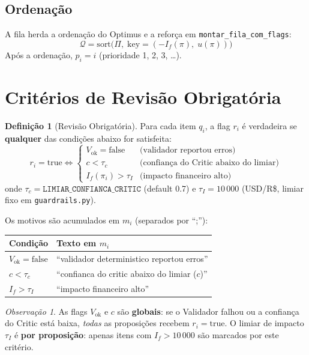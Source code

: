 \documentclass[a4paper, 12pt]{report}
\theoremstyle{definition}
\newtheorem{definicao}{Defini\c{c}\~ao}[chapter]
\theoremstyle{remark}
\newtheorem{observacao}{Observa\c{c}\~ao}[chapter]
\newcommand{\fila}{\mathcal{Q}}
\begin{document}
\subsection{Ordena\c{c}\~ao}

A fila herda a ordena\c{c}\~ao do Optimus e a refor\c{c}a em
\texttt{montar\_fila\_com\_flags}:
\[
  \fila = \text{sort}\bigl(\Pi,\; \text{key}=(-I_f(\pi),\; u(\pi))\bigr)
\]
Ap\'os a ordena\c{c}\~ao, $p_i = i$ (prioridade 1, 2, 3, \ldots).


\section{Crit\'erios de Revis\~ao Obrigat\'oria}

\begin{definicao}[Revis\~ao Obrigat\'oria]
  Para cada item $q_i$, a flag $r_i$ \'e verdadeira se \textbf{qualquer}
  das condi\c{c}\~oes abaixo for satisfeita:
  \[
    r_i = \text{true} \iff
    \begin{cases}
      V_{\text{ok}} = \text{false} &
        \text{(validador reportou erros)} \\[4pt]
      c < \tau_c &
        \text{(confian\c{c}a do Critic abaixo do limiar)} \\[4pt]
      I_f(\pi_i) > \tau_I &
        \text{(impacto financeiro alto)}
    \end{cases}
  \]
  onde $\tau_c = \texttt{LIMIAR\_CONFIANCA\_CRITIC}$ (default 0.7) e
  $\tau_I = 10\,000$ (USD/R\$, limiar fixo em \texttt{guardrails.py}).
\end{definicao}

Os motivos s\~ao acumulados em $m_i$ (separados por ``;''):

\begin{center}
\begin{tabular}{ll}
  \toprule
  \textbf{Condi\c{c}\~ao} & \textbf{Texto em $m_i$} \\
  \midrule
  $V_{\text{ok}} = \text{false}$ &
    ``validador deterministico reportou erros'' \\
  $c < \tau_c$ &
    ``confianca do critic abaixo do limiar ($c$)'' \\
  $I_f > \tau_I$ &
    ``impacto financeiro alto'' \\
  \bottomrule
\end{tabular}
\end{center}

\begin{observacao}
  As flags $V_{\text{ok}}$ e $c$ s\~ao \textbf{globais}: se o Validador
  falhou ou a confian\c{c}a do Critic est\'a baixa, \textit{todas} as
  proposi\c{c}\~oes recebem $r_i = \text{true}$. O limiar de impacto
  $\tau_I$ \'e \textbf{por proposi\c{c}\~ao}: apenas itens com
  $I_f > 10\,000$ s\~ao marcados por este crit\'erio.
\end{observacao}
\end{document}
